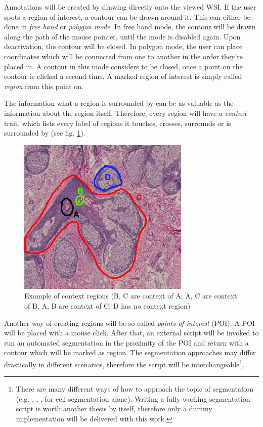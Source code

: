 Annotations will be created by drawing directly onto the viewed WSI. If the user spots a region of interest, a contour can be drawn around it. This can  either be done in \emph{free hand} or \emph{polygon mode}. In free hand mode, the contour will be drawn along the path of the mouse pointer, until the mode is disabled again. Upon deactivation, the contour will be closed. In polygon mode, the user can place coordinates which will be connected from one to another in the order they're placed in. A contour in this mode considers to be closed, once a point on the contour is clicked a second time. A marked region of interest is simply called \emph{region} from this point on.

The information what a region is surrounded by can be as valuable as the information about the region itself\cite{Bankman00}. Therefore, every region will have a \emph{context} trait, which lists every label of regions it touches, crosses, surrounds or is surrounded by (see fig. \ref{fig4_contextregions}).

\begin{figure}[H]
	\begin{center}
		\includegraphics[scale=0.8]{img/contextregions.png}
		\caption{Example of context regions (B, C are context of A; A, C are context of B; A, B are context of C; D has no context region)}
		\label{fig4_contextregions}
	\end{center}
\end{figure}

Another way of creating regions will be so called \emph{points of interest} (POI). A POI will be placed with a mouse click. After that, an external script will be invoked to run an automated segmentation in the proximity of the POI and return with a contour which will be marked as region. The segmentation approaches may differ drastically in different scenarios\cite{Liu12}, therefore the script will be interchangeable\footnote{There are many different ways of how to approach the topic of segmentation (e.g. \cite{Qi12}, \cite{Sharma16}, \cite{Wienert12}, \cite{Angulo10} for cell segmentation alone). Writing a fully working segmentation script is worth another thesis by itself, therefore only a dummy implementation will be delivered with this work.}.

